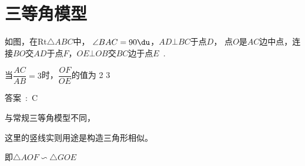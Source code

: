 \section{三等角模型}


如图，在$\mathrm{Rt}\triangle{}ABC$中，
$\angle{}BAC=90\du$，$AD\bot{}BC$于点$D$，
点$O$是$AC$边中点，连接$BO$交$AD$于点$F$，$OE\bot{}OB$交$BC$边于点$E$~.~

当$\dfrac{AC}{AB}=3$时，$\dfrac{OF}{OE}$的值为
\xxs
{}
{2}
{3}
{}

\newpage{}

答案~:~C

与常规三等角模型不同，

这里的竖线实则用途是构造三角形相似。

即$\triangle{}AOF\backsim{}\triangle{}GOE$

